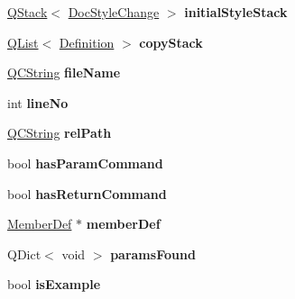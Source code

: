 \begin{DoxyCompactItemize}
\mbox{\hyperlink{class_q_stack}{Q\+Stack}}$<$ \mbox{\hyperlink{class_doc_style_change}{Doc\+Style\+Change}} $>$ {\bfseries initial\+Style\+Stack}
\item 
\mbox{\label{struct_doc_parser_context_a1fc927af6a2675bc3d2f480efbed7533}} 
\mbox{\hyperlink{class_q_list}{Q\+List}}$<$ \mbox{\hyperlink{class_definition}{Definition}} $>$ {\bfseries copy\+Stack}
\item 
\mbox{\label{struct_doc_parser_context_a2b4c522f7f52850b1956b1b1504c4f1b}} 
\mbox{\hyperlink{class_q_c_string}{Q\+C\+String}} {\bfseries file\+Name}
\item 
\mbox{\label{struct_doc_parser_context_a9c5213ee28d100e9ad9fbd9518d2a099}} 
int {\bfseries line\+No}
\item 
\mbox{\label{struct_doc_parser_context_a603ea82abcc694bf2aeb91d85378aa0d}} 
\mbox{\hyperlink{class_q_c_string}{Q\+C\+String}} {\bfseries rel\+Path}
\item 
\mbox{\label{struct_doc_parser_context_adfc69df470290ef49cf32d0e6cd83556}} 
bool {\bfseries has\+Param\+Command}
\item 
\mbox{\label{struct_doc_parser_context_ae20ce1c3e50ef1b4399b50f29f61607f}} 
bool {\bfseries has\+Return\+Command}
\item 
\mbox{\label{struct_doc_parser_context_ae598a4b4f7337ef13ffaff9df878a8df}} 
\mbox{\hyperlink{class_member_def}{Member\+Def}} $\ast$ {\bfseries member\+Def}
\item 
\mbox{\label{struct_doc_parser_context_a304223304af1183a5afa3b9a36a921af}} 
Q\+Dict$<$ void $>$ {\bfseries params\+Found}
\item 
\mbox{\label{struct_doc_parser_context_aa499773e2ac0458b4f616b07386e5685}} 
bool {\bfseries is\+Example}
\item 
\mbox{\label{struct_doc_parser_context_a688f0551d40b6f51fb0daaa76631502b}} 

\end{DoxyCompactItemize}
